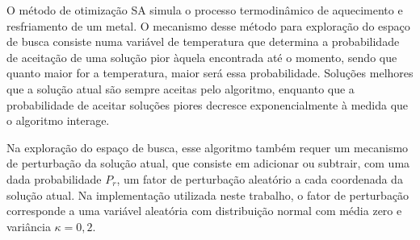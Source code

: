 O  método de otimização \ac{SA} simula o processo termodinâmico de aquecimento e resfriamento de um metal. O mecanismo desse método para exploração do espaço de busca consiste numa variável de temperatura que determina a probabilidade de aceitação de uma solução pior àquela encontrada até o momento, sendo que quanto maior for a temperatura, maior será essa probabilidade. Soluções melhores que a solução atual são sempre aceitas pelo algoritmo, enquanto que a probabilidade de aceitar soluções piores decresce exponencialmente à medida que o algoritmo interage.  

Na exploração do espaço de busca, esse algoritmo também requer um mecanismo de perturbação da solução atual, que consiste em adicionar ou subtrair, com uma dada probabilidade $P_r$, um fator de perturbação aleatório a cada coordenada da solução atual. Na implementação utilizada neste trabalho, o fator de perturbação corresponde a uma variável aleatória com distribuição normal com média zero e variância $\kappa = 0,2$.

\begin{comment}
\begin{algorithm}[ht]
\caption{Simulated Annealing}
\label{alg:sa}
\begin{algorithmic}
\Require $N\text{,}\:M\text{,}\:T_0\text{,}\:P\text{,}\:L> 0$, $:\alpha\text{,}\:\kappa\text{,}\:P_r \in [0,1]$, $\:COST$.
\Ensure The best found solution that minimizes $COST$.

\Function{DISTURB}{$\boldsymbol{v}$}
\State $f \gets$ \Call{$COST$}{$\boldsymbol{v}$}
\For{$i = 0,\:1,\:\cdots,\:M-1$} 
\If {$P_r > U(0,1)$}
\State $aux \gets v[i]$
\State $v[i] \gets v[i]+ \kappa.(1+f).\mathcal{N}(0,1).v[i]$
\If {$v[i] \notin [0.125,125.5]$}
\State $v[i] \gets aux$
\EndIf
\EndIf
\EndFor
\State \Return $\boldsymbol{v}$
\EndFunction

\State $i \gets 1$, $n \gets 0$,$T \gets T_0$
\For{$j = 0,\:1,\:\cdots,\:M-1$} 
\State $s[j] \gets U(0.125,125.5)$
\EndFor
\State $fit \gets$ \Call{$COST$}{$\boldsymbol{s}$} 
\Repeat
\State $\boldsymbol{s_d} \gets$ \Call{$Disturb$}{$\boldsymbol{s}$}
\State $\delta \gets$ \Call{$COST$}{$\boldsymbol{s_d}$}$- fit$ 
\If {$\delta < 0$ or $\exp{(\frac{\delta}{T})} > U(0,1)$}
\State $\boldsymbol{s} \gets \boldsymbol{s_d}$,$fit \gets $ \Call{$COST$}{$\boldsymbol{s_d}$}
$n \gets n + 1$
\EndIf
\State $i \gets i + 1$
\Until{$i > P$ or $n > L$}
\State $T \gets \alpha.T$
\end{algorithmic}
\end{algorithm}
\end{comment}

